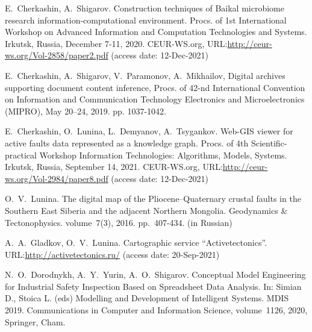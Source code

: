\documentclass[a4paper]{jctart19a}
\begin{document}
\begin{thebibliography}{99}
 E.~Cherkashin, A.~Shigarov. Construction techniques of Baikal microbiome research information-computational environment.  Procs. of 1st International Workshop on Advanced Information and Computation Technologies and Systems. Irkutsk, Russia, December 7-11, 2020. CEUR-WS.org, URL:\url{http://ceur-ws.org/Vol-2858/paper2.pdf} (access date: 12-Dec-2021)

 E.~Cherkashin, A.~Shigarov, V.~Paramonov, A.~Mikhailov, Digital archives supporting document content inference, Procs.  of 42-nd International Convention on Information and Communication Technology Electronics and Microelectronics (MIPRO), May 20–24, 2019.  pp. 1037-1042. 

 E.~Cherkashin, O.~Lunina, L.~Demyanov, A.~Tsygankov. Web-GIS viewer for active faults data represented as a knowledge graph.  Procs. of 4th Scientific-practical Workshop Information Technologies: Algorithms, Models, Systems. Irkutsk, Russia, September 14, 2021. CEUR-WS.org, URL:\url{http://ceur-ws.org/Vol-2984/paper8.pdf} (access date: 12-Dec-2021)

 O.~V.~Lunina.  The digital map of the Pliocene–Quaternary crustal faults in the Southern East Siberia and the adjacent Northern Mongolia.  Geodynamics \& Tectonophysics.  volume~7(3), 2016.  pp.~407-434. (in Russian) 

 A.~A.~Gladkov, O.~V.~Lunina. Cartographic service ``Activetectonics''. URL:\url{http://activetectonics.ru/} (access date: 20-Sep-2021)

 N.~O.~Dorodnykh, A.~Y.~Yurin, A.~O.~Shigarov. Conceptual Model Engineering for Industrial Safety Inspection Based on Spreadsheet Data Analysis.  In: Simian D., Stoica L. (eds) Modelling and Development of Intelligent Systems.  MDIS 2019.  Communications in Computer and Information Science, volume~1126, 2020, Springer, Cham. 





\end{thebibliography}
\end{document}
